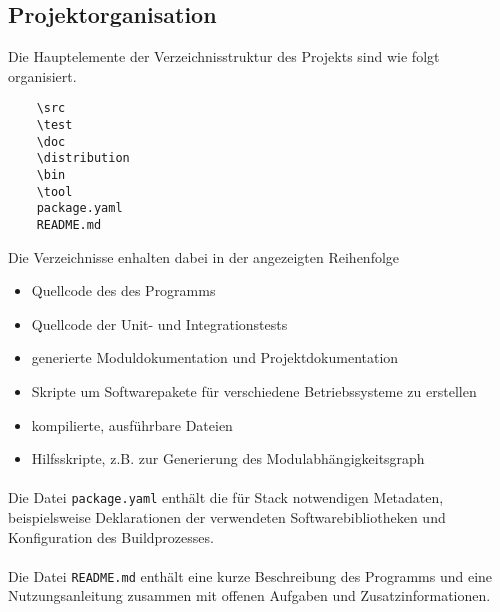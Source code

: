 \subsection{Projektorganisation}
Die Hauptelemente der Verzeichnisstruktur des Projekts sind wie folgt organisiert.

\begin{verbatim}
    \src
    \test
    \doc
    \distribution
    \bin
    \tool
    package.yaml
    README.md
\end{verbatim}

Die Verzeichnisse enhalten dabei in der angezeigten Reihenfolge

\begin{itemize}
    \item Quellcode des des Programms
    \item Quellcode der Unit- und Integrationstests
    \item generierte Moduldokumentation und Projektdokumentation
    \item Skripte um Softwarepakete für verschiedene Betriebssysteme zu erstellen
    \item kompilierte, ausführbare Dateien
    \item Hilfsskripte, z.B. zur Generierung des Modulabhängigkeitsgraph
\end{itemize}

\paragraph{}
Die Datei \texttt{package.yaml} enthält die für Stack notwendigen Metadaten,
beispielsweise Deklarationen der verwendeten Softwarebibliotheken und Konfiguration
des Buildprozesses.

\paragraph{}
Die Datei \texttt{README.md} enthält eine kurze Beschreibung des
Programms und eine Nutzungsanleitung zusammen mit offenen Aufgaben und
Zusatzinformationen.